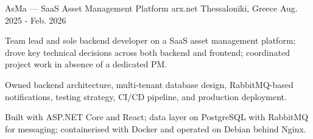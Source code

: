 

\begin{cventries}

  \cventry%
    {AsMa --- SaaS Asset Management Platform} %
    {arx.net} %
    {Thessaloniki, Greece} %
    {Aug. 2025 - Feb. 2026} %
    {
      \begin{cvitems}
        \item {Team lead and sole backend developer on a SaaS asset management platform; drove key technical decisions across both backend and frontend; coordinated project work in absence of a dedicated PM.}
        \item {Owned backend architecture, multi-tenant database design, RabbitMQ-based notifications, testing strategy, CI/CD pipeline, and production deployment.}
        \item {Built with ASP.NET Core and React; data layer on PostgreSQL with RabbitMQ for messaging; containerised with Docker and operated on Debian behind Nginx.}
      \end{cvitems}
    }

\end{cventries}
